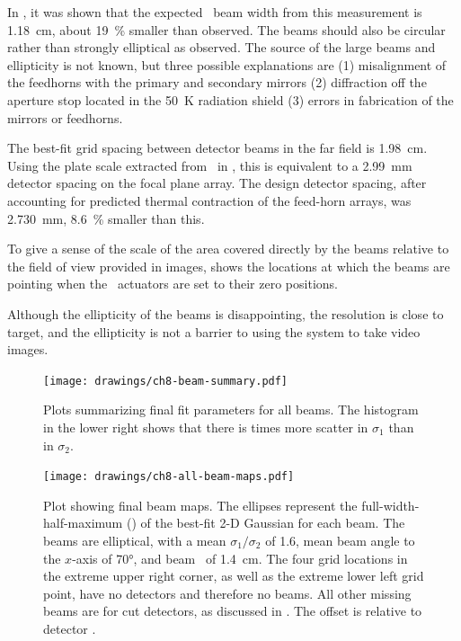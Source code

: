 In , it was shown that the expected \FWHM\ beam width from this measurement is \SI{1.18}{\cm}, about \SI{19}{\percent} smaller than observed.
The beams should also be circular rather than strongly elliptical as observed.
The source of the large beams and ellipticity is not known, but three possible explanations are (1) misalignment of the feedhorns with the primary and secondary mirrors (2) diffraction off the aperture stop located in the \SI{50}{\kelvin} radiation shield (3) errors in fabrication of the mirrors or feedhorns.

The best-fit grid spacing between detector beams in the far field is \SI{1.98}{\cm}.
Using the plate scale extracted from \ZEMAX\ in , this is equivalent to a \SI{2.99}{\mm} detector spacing on the focal plane array.
The design detector spacing, after accounting for predicted thermal contraction of the feed-horn arrays, was \SI{2.730}{\mm}, \SI{8.6}{\percent} smaller than this.

To give a sense of the scale of the area covered directly by the beams relative to the field of view provided in images,  shows the locations at which the beams are pointing when the \BOSE\ actuators are set to their zero positions.

Although the ellipticity of the beams is disappointing, the resolution is close to target, and the ellipticity is not a barrier to using the system to take video images.

\begin{figure}
\centering
\texttt{[image: drawings/ch8-beam-summary.pdf]}
\caption[Beam fit parameters]{
  Plots summarizing final fit parameters for all beams.
  The histogram in the lower right shows that there is  times more scatter in $\sigma_1$ than in $\sigma_2$. 
}
\label{fig:ch8-beam-summary}
\end{figure}

\begin{figure}
\centering
\texttt{[image: drawings/ch8-all-beam-maps.pdf]}
\caption[Beam maps]{
Plot showing final beam maps.
The ellipses represent the full-width-half-maximum (\FWHM) of the best-fit 2-D Gaussian for each beam. The beams are elliptical, with a mean $\sigma_1/\sigma_2$ of 1.6, mean beam angle to the $x$-axis of \ang{70}, and beam \FWHM\ of \SI{1.4}{\cm}.
The four grid locations in the extreme upper right corner, as well as the extreme lower left grid point, have no detectors and therefore no beams. All other missing beams are for cut detectors, as discussed in .
The offset is relative to detector .
}
\label{fig:ch8-all-beam-maps}
\end{figure}


